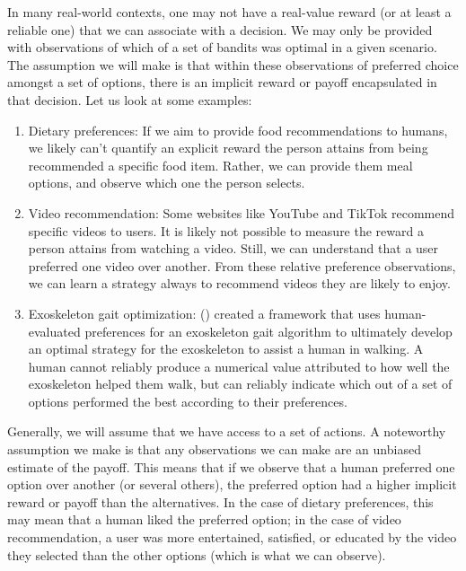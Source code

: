 \documentclass[
  letterpaper,
  numbers=noenddot,
  DIV=11,
  oneside]{scrreprt}
\theoremstyle{remark}
\begin{document}
In many real-world contexts, one may not have a real-value reward (or at
least a reliable one) that we can associate with a decision. We may only
be provided with observations of which of a set of bandits was optimal
in a given scenario. The assumption we will make is that within these
observations of preferred choice amongst a set of options, there is an
implicit reward or payoff encapsulated in that decision. Let us look at
some examples:

\begin{enumerate}
\def\labelenumi{\arabic{enumi}.}
\item
  Dietary preferences: If we aim to provide food recommendations to
  humans, we likely can't quantify an explicit reward the person attains
  from being recommended a specific food item. Rather, we can provide
  them meal options, and observe which one the person selects.
\item
  Video recommendation: Some websites like YouTube and TikTok recommend
  specific videos to users. It is likely not possible to measure the
  reward a person attains from watching a video. Still, we can
  understand that a user preferred one video over another. From these
  relative preference observations, we can learn a strategy always to
  recommend videos they are likely to enjoy.
\item
  Exoskeleton gait optimization:
  () created
  a framework that uses human-evaluated preferences for an exoskeleton
  gait algorithm to ultimately develop an optimal strategy for the
  exoskeleton to assist a human in walking. A human cannot reliably
  produce a numerical value attributed to how well the exoskeleton
  helped them walk, but can reliably indicate which out of a set of
  options performed the best according to their preferences.
\end{enumerate}

Generally, we will assume that we have access to a set of actions. A
noteworthy assumption we make is that any observations we can make are
an unbiased estimate of the payoff. This means that if we observe that a
human preferred one option over another (or several others), the
preferred option had a higher implicit reward or payoff than the
alternatives. In the case of dietary preferences, this may mean that a
human liked the preferred option; in the case of video recommendation, a
user was more entertained, satisfied, or educated by the video they
selected than the other options (which is what we can observe).
\end{document}
